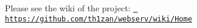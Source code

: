 Please see the wiki of the project\+: \href{https://github.com/th1zan/webserv/wiki/Home}{\texttt{ https\+://github.\+com/th1zan/webserv/wiki/\+Home}} 